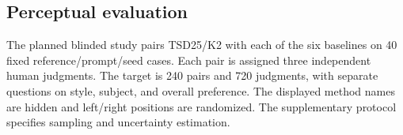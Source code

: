 \begin{table}[t]
\centering\small
\caption{Held-out comparison, results pending. Each row has a planned
720 cells on the same 40-reference, six-prompt, three-seed grid. TBD denotes
an unfilled result, including rows whose generation may already be complete.}
\label{tab:heldoutpending}

\end{table}


\subsection{Perceptual evaluation}
\label{sec:human}
The planned blinded study pairs TSD25/K2 with each of the six baselines on
40 fixed reference/prompt/seed cases. Each pair is assigned three independent
human judgments. The target is 240 pairs and 720 judgments, with separate
questions on style, subject, and overall preference. The displayed method
names are hidden and left/right positions are randomized. The supplementary
protocol specifies sampling and uncertainty estimation.

